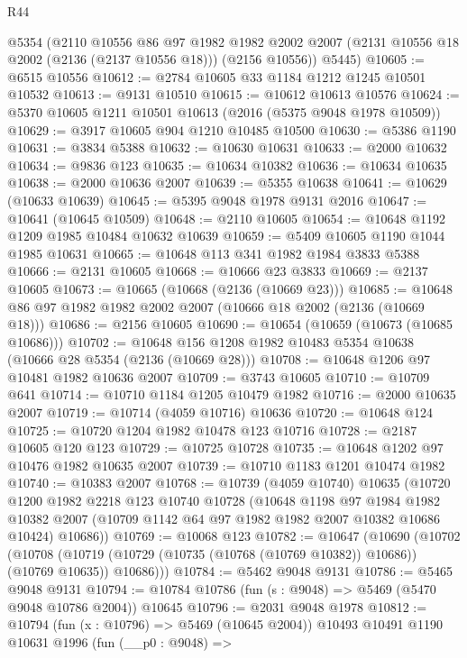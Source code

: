 \begin{lexlean}{R44}
\begin{coremodule}
      @5354
      (@2110
        @10556
        @86
        @97
        @1982
        @1982
        @2002
        @2007
        (@2131 @10556 @18 @2002 (@2136 (@2137 @10556 @18)))
        (@2156 @10556))
      @5445)
@10605 := @6515 @10556
@10612 := @2784 @10605 @33 @1184 @1212 @1245 @10501 @10532
@10613 := @9131 @10510
@10615 := @10612 @10613 @10576
@10624 := @5370 @10605 @1211 @10501 @10613 (@2016 (@5375 @9048 @1978 @10509))
@10629 := @3917 @10605 @904 @1210 @10485 @10500
@10630 := @5386 @1190
@10631 := @3834 @5388
@10632 := @10630 @10631
@10633 := @2000 @10632
@10634 := @9836 @123
@10635 := @10634 @10382
@10636 := @10634 @10635
@10638 := @2000 @10636 @2007
@10639 := @5355 @10638
@10641 := @10629 (@10633 @10639)
@10645 := @5395 @9048 @1978 @9131 @2016
@10647 := @10641 (@10645 @10509)
@10648 := @2110 @10605
@10654 := @10648 @1192 @1209 @1985 @10484 @10632 @10639
@10659 := @5409 @10605 @1190 @1044 @1985 @10631
@10665 := @10648 @113 @341 @1982 @1984 @3833 @5388
@10666 := @2131 @10605
@10668 := @10666 @23 @3833
@10669 := @2137 @10605
@10673 := @10665 (@10668 (@2136 (@10669 @23)))
@10685 := @10648 @86 @97 @1982 @1982 @2002 @2007 (@10666 @18 @2002 (@2136 (@10669 @18)))
@10686 := @2156 @10605
@10690 := @10654 (@10659 (@10673 (@10685 @10686)))
@10702 := @10648 @156 @1208 @1982 @10483 @5354 @10638 (@10666 @28 @5354 (@2136 (@10669 @28)))
@10708 := @10648 @1206 @97 @10481 @1982 @10636 @2007
@10709 := @3743 @10605
@10710 := @10709 @641
@10714 := @10710 @1184 @1205 @10479 @1982
@10716 := @2000 @10635 @2007
@10719 := @10714 (@4059 @10716) @10636
@10720 := @10648 @124
@10725 := @10720 @1204 @1982 @10478 @123 @10716
@10728 := @2187 @10605 @120 @123
@10729 := @10725 @10728
@10735 := @10648 @1202 @97 @10476 @1982 @10635 @2007
@10739 := @10710 @1183 @1201 @10474 @1982
@10740 := @10383 @2007
@10768 := @10739
    (@4059 @10740)
    @10635
    (@10720
      @1200
      @1982
      @2218
      @123
      @10740
      @10728
      (@10648
        @1198
        @97
        @1984
        @1982
        @10382
        @2007
        (@10709 @1142 @64 @97 @1982 @1982 @2007 @10382 @10686 @10424)
        @10686))
@10769 := @10068 @123
@10782 := @10647
    (@10690
      (@10702
        (@10708 (@10719 (@10729 (@10735 (@10768 (@10769 @10382)) @10686)) (@10769 @10635)) @10686)))
@10784 := @5462 @9048 @9131
@10786 := @5465 @9048 @9131
@10794 := @10784 @10786 (fun (s : @9048) => @5469 (@5470 @9048 @10786 @2004)) @10645
@10796 := @2031 @9048 @1978
@10812 := @10794
    (fun (x : @10796) => @5469 (@10645 @2004))
    @10493
    @10491
    @1190
    @10631
    @1996
    (fun (__p0 : @9048) =>

\end{coremodule}
\end{lexlean}
